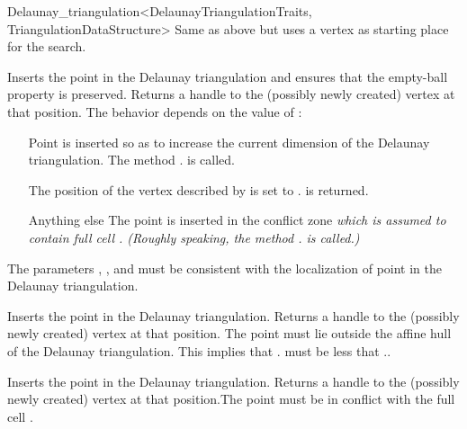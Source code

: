 \begin{ccRefClass}{Delaunay_triangulation<DelaunayTriangulationTraits, TriangulationDataStructure>}
%
{Same as above but uses a vertex as starting place for the search.}

\begin{ccAdvanced}

{Inserts the point  in the Delaunay triangulation
and ensures that the empty-ball property is preserved.
Returns a handle to the
(possibly newly created) vertex at that position. The behavior depends on the
value of :\begin{itemize} \item[\ccc{OUTSIDE_AFFINE_HULL}] Point
 is inserted so as to increase the current dimension of the Delaunay
triangulation. The method \ccVar. is called.
\item[\ccc{ON_VERTEX}] The position of the vertex  described by 
is set to .  is returned. \item[Anything else] The point 
is inserted in the conflict zone \em{which is assumed} to contain 
full cell
. (Roughly speaking, the method \ccVar.
is called.)\end{itemize} \ccPrecond The parameters , , 
and  must be consistent with the localization of point  in the
Delaunay triangulation.}

{Inserts the point  in the Delaunay triangulation. Returns a handle to the
(possibly newly created) vertex at that position. \ccPrecond The point 
must lie outside the affine hull of the Delaunay triangulation. This implies that
\ccVar. must be less that
\ccVar..}

{Inserts the point  in the Delaunay triangulation. Returns a handle to the
(possibly newly created) vertex at that position.\ccPrecond The point 
must be in conflict with the full cell .}

\end{ccAdvanced}




\end{ccRefClass}
